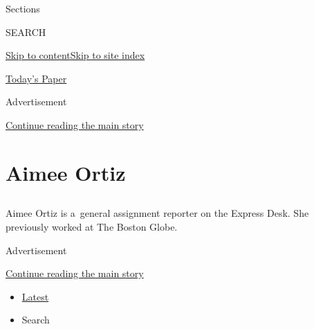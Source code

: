 Sections

SEARCH

\protect\hyperlink{site-content}{Skip to
content}\protect\hyperlink{site-index}{Skip to site index}

\href{https://myaccount.nytimes.com/auth/login?response_type=cookie\&client_id=vi}{}

\href{https://www.nytimes.com/section/todayspaper}{Today's Paper}

Advertisement

\protect\hyperlink{after-top}{Continue reading the main story}

\hypertarget{aimee-ortiz}{%
\section{Aimee Ortiz}\label{aimee-ortiz}}

\subsection{}

Aimee Ortiz is a~general assignment reporter on the Express Desk. She
previously worked at The Boston Globe.

Advertisement

\protect\hyperlink{after-mid1}{Continue reading the main story}

\begin{itemize}
\tightlist
\item
  \protect\hyperlink{stream-panel}{Latest}
\item
  Search
\end{itemize}


